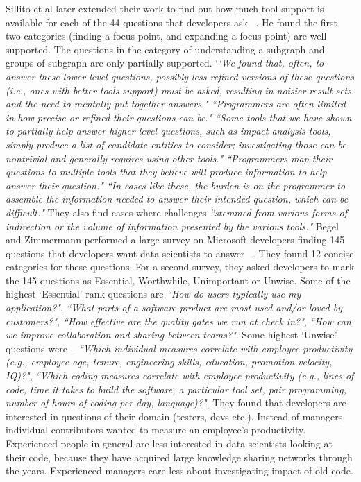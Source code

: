 Sillito et al later extended their work to find out how much tool support is available for each of the 44 questions that developers ask ~\cite{Sillito:2008}. He found the first two categories (finding a focus point, and expanding a focus point) are well supported. The questions in the category of understanding a subgraph and groups of subgraph are only partially supported. `\textit{`We found that, often, to answer these lower level questions, possibly less refined versions of these questions (i.e., ones with better tools support) must be asked, resulting in noisier result sets and the need to mentally put together answers." ``Programmers are often limited in how precise or refined their questions can be." ``Some tools that we have shown to partially help answer higher level questions, such as impact analysis tools, simply produce a list of candidate entities to consider; investigating those can be nontrivial and generally requires using other tools." ``Programmers map their questions to multiple tools that they believe will produce information to help answer their question." ``In cases like these, the burden is on the programmer to assemble the information needed to answer their intended question, which can be difficult." }They also find cases where challenges \textit{``stemmed from various forms of indirection or the volume of information presented by the various tools."}
Begel and Zimmermann performed a large survey on Microsoft developers finding 145 questions that developers want data scientists to answer ~\cite{Begel:2014}. They found 12 concise categories for these questions. For a second survey, they asked developers to mark the 145 questions as Essential, Worthwhile, Unimportant or Unwise. Some of the highest `Essential' rank questions are\textit{ ``How do users typically use my application?"}, \textit{``What parts of a software product are most used and/or loved by customers?", ``How effective are the quality gates we run at check in?"}, \textit{``How can we improve collaboration and sharing between teams?"}. Some highest `Unwise' questions were – \textit{``Which individual measures correlate with employee productivity (e.g., employee age, tenure, engineering skills, education, promotion velocity, IQ)?"}, \textit{``Which coding measures correlate with employee productivity (e.g., lines of code, time it takes to build the software, a particular tool set, pair programming, number of hours of coding per day, language)?"}.  They found that developers are interested in questions of their domain (testers, devs etc.). Instead of managers, individual contributors wanted to measure an employee's productivity. Experienced people in general are less interested in data scientists looking at their code, because they have acquired large knowledge sharing networks through the years. Experienced managers care less about investigating impact of old code.

